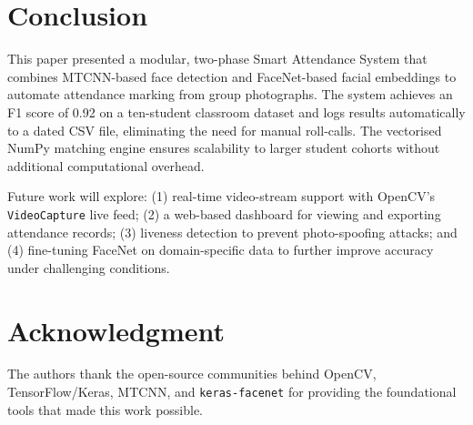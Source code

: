 \documentclass[conference]{IEEEtran}
\begin{document}
\section{Conclusion}

This paper presented a modular, two-phase Smart Attendance System that
combines MTCNN-based face detection and FaceNet-based facial embeddings
to automate attendance marking from group photographs. The system
achieves an F1 score of 0.92 on a ten-student classroom dataset and
logs results automatically to a dated CSV file, eliminating the need
for manual roll-calls. The vectorised NumPy matching engine ensures
scalability to larger student cohorts without additional computational
overhead.

Future work will explore: (1) real-time video-stream support with
OpenCV's \texttt{VideoCapture} live feed; (2) a web-based dashboard
for viewing and exporting attendance records; (3) liveness detection
to prevent photo-spoofing attacks; and (4) fine-tuning FaceNet on
domain-specific data to further improve accuracy under challenging
conditions.

\section*{Acknowledgment}

The authors thank the open-source communities behind OpenCV,
TensorFlow/Keras, MTCNN, and \texttt{keras-facenet} for providing the
foundational tools that made this work possible.
\end{document}
